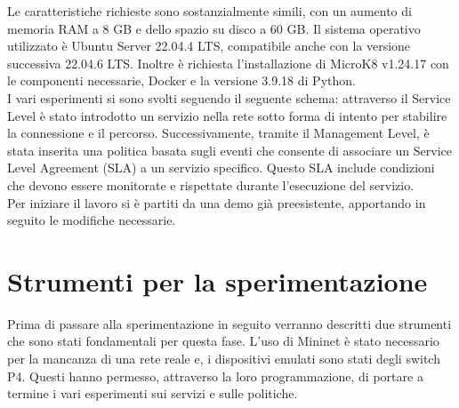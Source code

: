 Le caratteristiche richieste sono sostanzialmente simili, con un aumento di memoria RAM a 8 GB e dello spazio su disco a 60 GB.
Il sistema operativo utilizzato è Ubuntu Server 22.04.4 LTS, compatibile anche con la versione successiva 22.04.6 LTS. 
Inoltre è richiesta l'installazione di MicroK8 v1.24.17 con le componenti necessarie, Docker e la versione 3.9.18 di Python.
\\I vari esperimenti si sono svolti seguendo il seguente schema:
attraverso il Service Level è stato introdotto un servizio nella rete sotto forma di intento per stabilire la connessione e il percorso. 
Successivamente, tramite il Management Level, è stata inserita una politica basata sugli eventi che consente di associare un Service Level Agreement (SLA) a un servizio specifico.
Questo SLA include condizioni che devono essere monitorate e rispettate durante l'esecuzione del servizio.
\\Per iniziare il lavoro si è partiti da una demo già preesistente, apportando in seguito le modifiche necessarie.
\section{Strumenti per la sperimentazione}
Prima di passare alla sperimentazione in seguito verranno descritti due strumenti che sono stati fondamentali per questa fase.
L'uso di Mininet è stato necessario per la mancanza di una rete reale e, i dispositivi emulati sono 
stati degli switch P4.
Questi hanno permesso, attraverso la loro programmazione, di portare a termine i vari esperimenti sui 
servizi e sulle politiche.

